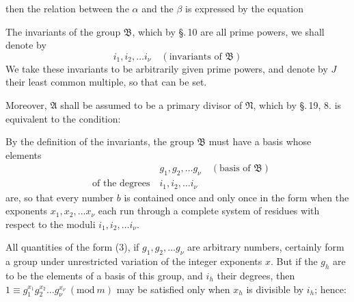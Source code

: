 then the relation between the $\alpha$ and the $\beta$ is expressed by the
equation


The invariants of the group $\mathfrak{B}$, which by \S.\,10 are all prime powers, we shall denote by
\[
i_1, i_2, \dots i_\nu \quad (\text{invariants of } \mathfrak{B})
\]
We take these invariants to be arbitrarily given
prime powers, and denote by $J$ their least common multiple, so that
can be set.

Moreover, $\mathfrak{A}$ shall be assumed to be a primary divisor of $\mathfrak{N}$, which by \S.\,19, 8. is equivalent to the condition:


By the definition of the invariants, the group $\mathfrak{B}$ must have a basis whose elements
\[
\begin{aligned}
&\phantom{\text{of the degrees}} \quad g_1, g_2, \dots g_\nu \quad (\text{basis of } \mathfrak{B})\\
&\text{of the degrees} \quad i_1, i_2, \dots i_\nu
\end{aligned}
\]
are, so that every number $b$ is contained once and only once in the form
when the exponents $x_1, x_2, \dots x_\nu$ each run through a complete system of residues with respect to the moduli $i_1, i_2, \dots i_\nu$.

All quantities of the form (3), if $g_1, g_2, \dots g_\nu$ are arbitrary numbers, certainly form a group under unrestricted variation of the integer exponents $x$. But if the $g_h$ are to be the elements of a basis of this group, and $i_h$ their degrees, then $1\equiv g_1^{x_1}g_2^{x_2}\dots g_\nu^{x_\nu}\ (\mathrm{mod}\ m)$ may be satisfied only when $x_h$ is divisible by $i_h$; hence:

